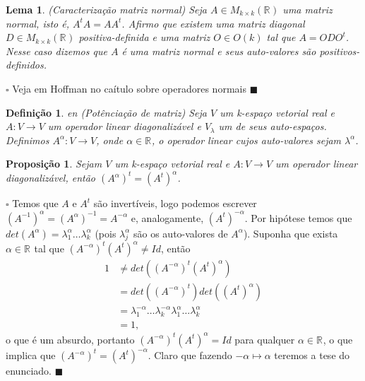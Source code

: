 \documentclass[12pt]{book}
\newtheorem{lema}[teorema]{Lema}
\newtheorem{definicao}[teorema]{Definição}
\newtheorem{proposicao}[teorema]{Proposição}
\newenvironment{prova}[1]{$\square$ #1}{\hfill$\blacksquare$}
\newcommand{\matrizortogonal}[1]{O(#1)}
\newcommand{\matrizquadreal}[1]{M_{#1 \times #1}(\real{})}
\newcommand{\real}[1]{\mathbb{R}^{#1}}
\newcommand{\vermelho}[1]{{\color{red}#1}}
\begin{document}
	\begin{lema}\label{lema_caracterizacao_matriz_normal}
		(Caracterização matriz normal) Seja $A\in \matrizquadreal{k}$ uma matriz normal, isto é, $A^{t}A=AA^{t}$. Afirmo que existem uma matriz diagonal $D \in \matrizquadreal{k}$ positiva-definida e uma matriz $O\in \matrizortogonal{k}$ tal que $A=ODO^{t}$. Nesse caso dizemos que $A$ é uma matriz normal e seus auto-valores são positivos-definidos. 
	\end{lema}
	\begin{prova}
		\vermelho{Veja em Hoffman no caítulo sobre operadores normais}
	\end{prova}

	\begin{definicao}\label{definicao_potenciacao_matriz}
en		(Potênciação de matriz) Seja $V$ um k-espaço vetorial real e $A:V \to V$ um operador linear diagonalizável e $V_{\lambda}$ um de seus auto-espaços. Definimos $A^{\alpha}:V \to V$, onde $\alpha \in \real{}$, o operador linear cujos auto-valores sejam $\lambda^{\alpha}$.
	\end{definicao}
	
	\begin{proposicao}\label{proposicao_transposta_potenciacao_matriz}
		Sejam $V$ um k-espaço vetorial real e $A:V\to V$ um operador linear diagonalizável, então $(A^{\alpha})^{t}=(A^{t})^{\alpha}$.
	\end{proposicao}
	\begin{prova}
		Temos que $A$ e $A^{t}$ são invertíveis, logo podemos escrever $(A^{-1})^{\alpha}=(A^{\alpha})^{-1}=A^{-\alpha}$ e, analogamente, $(A^{t})^{-\alpha}$. Por hipótese temos que $det(A^{\alpha}) = \lambda_{1}^{\alpha} \dots \lambda_{k}^{\alpha}$ (pois $\lambda_{j}^{\alpha}$ são os auto-valores de $A^{\alpha}$). Suponha que exista $\alpha \in \real{}$ tal que $(A^{-\alpha})^{t}(A^{t})^{\alpha} \neq Id$, então 
		$$
		\begin{aligned}
		1 &\neq det((A^{-\alpha})^{t}(A^{t})^{\alpha}) 
		\\
		&= det((A^{-\alpha})^{t})det((A^{t})^{\alpha})
		\\
		&= \lambda_{1}^{-\alpha} \dots \lambda_{k}^{-\alpha}\lambda_{1}^{\alpha} \dots \lambda_{k}^{\alpha}
		\\
		&=1,
		\end{aligned}
		$$
			o que é um absurdo, portanto $(A^{-\alpha})^{t}(A^{t})^{\alpha} =Id$ para qualquer $\alpha \in \real{}$, o que implica que $(A^{-\alpha})^{t}=(A^{t})^{-\alpha}$. Claro que fazendo $-\alpha \mapsto \alpha$ teremos a tese do enunciado.
	\end{prova}
	
\end{document}
